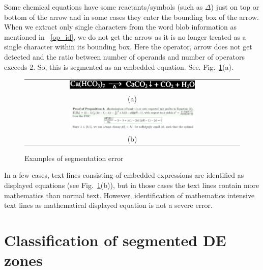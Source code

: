 \documentclass[oneside,a4paper,12pt]{book}
\begin{document}
Some chemical equations have some reactants/symbols (such as $\Delta$) just on top or bottom of the arrow   
 and in some cases they enter the bounding box of the arrow.  
  When we extract only single characters from the word blob information as mentioned in ~\ref{op_id},
 we do not get the arrow as it is no longer treated as a single character within its bounding box.
 Here the operator, arrow does not get detected and  the ratio between number of operands and number of operators exceeds 2.
 So, this is segmented as an embedded equation. See. Fig.~\ref{seg_error}(a).
 \begin{figure}[h]\center\footnotesize
\begin{tabular}{|c|}\hline
 \includegraphics[width=0.6\textwidth]{escan3.png} \\
 (a)\\ \hline
 \includegraphics[width=0.6\textwidth]{chem31.jpg}\\ 
  (b)\\ \hline
  \end{tabular} 
 \caption{Examples of segmentation error}
 \label{seg_error}
\end{figure}

In a few cases, text lines consisting of embedded expressions are identified as displayed equations 
(see Fig.~\ref{seg_error}(b)), but in those cases the text lines contain more mathematics than normal text.
However, identification of mathematics intensive text lines as mathematical displayed equation is not a severe error. 

\section{Classification of segmented DE zones}
\end{document}

